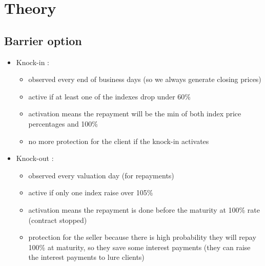 \section{Theory}

\subsection{Barrier option}
\begin{frame}
\myframetitle{}
\begin{itemize}
	\item Knock-in :
	\begin{itemize}
		\item observed every end of business days (so we always generate closing prices)
		\item active if at least one of the indexes drop under 60\%
		\item activation means the repayment will be the min of both index price percentages and 100\%
		\item no more protection for the client if the knock-in activates
	\end{itemize}
	\item Knock-out :
	\begin{itemize}
		\item observed every valuation day (for repayments) 
		\item active if only one index raise over 105\%
		\item activation means the repayment is done before the maturity at 100\% rate (contract stopped)
		\item protection for the seller because there is high probability they will repay 100\% at maturity, so they save some interest payments (they can raise the interest payments to lure clients)
	\end{itemize}
\end{itemize}
\end{frame}

